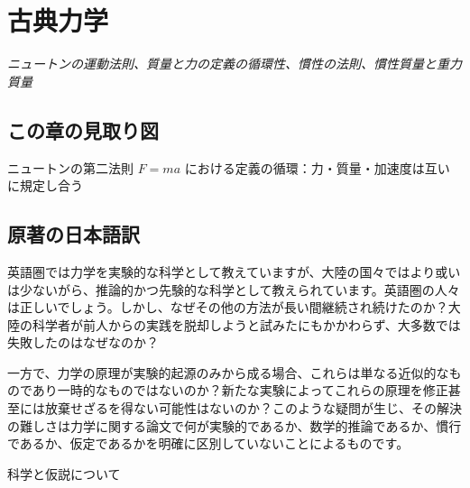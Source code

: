 \documentclass[a4paper,11pt,openany]{ltjsbook}
\begin{document}
\clearpage
\chapter{古典力学}
\begin{center}\large\textit{ニュートンの運動法則、質量と力の定義の循環性、慣性の法則、慣性質量と重力質量}\end{center}

\section*{この章の見取り図}
\begin{center}


\small ニュートンの第二法則 $F=ma$ における定義の循環：力・質量・加速度は互いに規定し合う
\end{center}

\section{原著の日本語訳}

英語圏では力学を実験的な科学として教えていますが、大陸の国々ではより或いは少ないがら、推論的かつ先験的な科学として教えられています。英語圏の人々は正しいでしょう。しかし、なぜその他の方法が長い間継続され続けたのか？大陸の科学者が前人からの実践を脱却しようと試みたにもかかわらず、大多数では失敗したのはなぜなのか？

一方で、力学の原理が実験的起源のみから成る場合、これらは単なる近似的なものであり一時的なものではないのか？新たな実験によってこれらの原理を修正甚至には放棄せざるを得ない可能性はないのか？このような疑問が生じ、その解決の難しさは力学に関する論文で何が実験的であるか、数学的推論であるか、慣行であるか、仮定であるかを明確に区別していないことによるものです。

科学と仮説について
\end{document}
